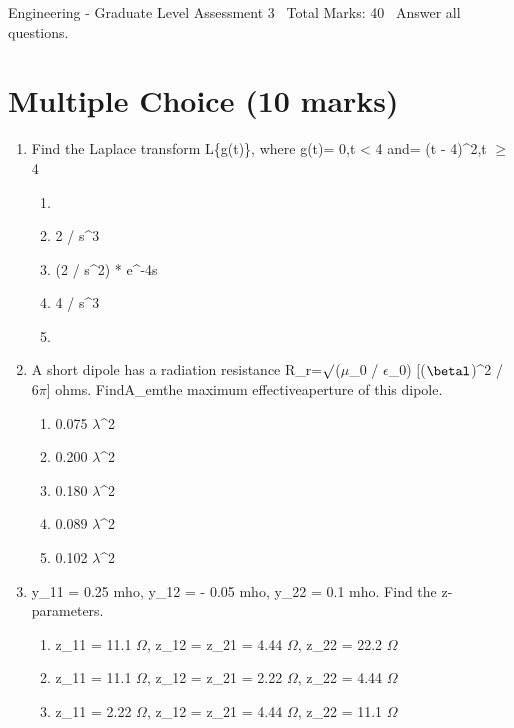 \documentclass[12pt]{article}
\begin{document}
\begin{center}
Engineering - Graduate Level Assessment 3 \
Total Marks: 40 \
Answer all questions.
\end{center}

\section*{Multiple Choice (10 marks)}
\begin{enumerate}[label=\arabic*.]
\item Find the Laplace transform L\{g(t)\}, where g(t)= 0,t \textless{} 4 and= (t - 4)\^{}2,t \ensuremath{\geq} 4
\begin{enumerate}[label=(\alph*)]
    \item [(2e\^{}-4s) / s\^{}3]
    \item 2 / s\^{}3
    \item (2 / s\^{}2) * e\^{}-4s
    \item 4 / s\^{}3
    \item [(2e\^{}-4s) / s\^{}4]
\end{enumerate}
\item A short dipole has a radiation resistance R\_r=\ensuremath{\surd}(\ensuremath{\mu}\_0 / \ensuremath{\epsilon}\_0) [(\ensuremath{\betal})\^{}2 /
6\ensuremath{\pi}] ohms. FindA\_emthe maximum effectiveaperture of this dipole.
\begin{enumerate}[label=(\alph*)]
    \item 0.075 \ensuremath{\lambda}\^{}2
    \item 0.200 \ensuremath{\lambda}\^{}2
    \item 0.180 \ensuremath{\lambda}\^{}2
    \item 0.089 \ensuremath{\lambda}\^{}2
    \item 0.102 \ensuremath{\lambda}\^{}2
\end{enumerate}
\item y\_11 = 0.25 mho, y\_12 = - 0.05 mho, y\_22 = 0.1 mho. Find the z-parameters.
\begin{enumerate}[label=(\alph*)]
    \item z\_11 = 11.1 \ensuremath{\Omega}, z\_12 = z\_21 = 4.44 \ensuremath{\Omega}, z\_22 = 22.2 \ensuremath{\Omega}
    \item z\_11 = 11.1 \ensuremath{\Omega}, z\_12 = z\_21 = 2.22 \ensuremath{\Omega}, z\_22 = 4.44 \ensuremath{\Omega}
    \item z\_11 = 2.22 \ensuremath{\Omega}, z\_12 = z\_21 = 4.44 \ensuremath{\Omega}, z\_22 = 11.1 \ensuremath{\Omega}

\end{enumerate}
\end{enumerate}
\end{document}
